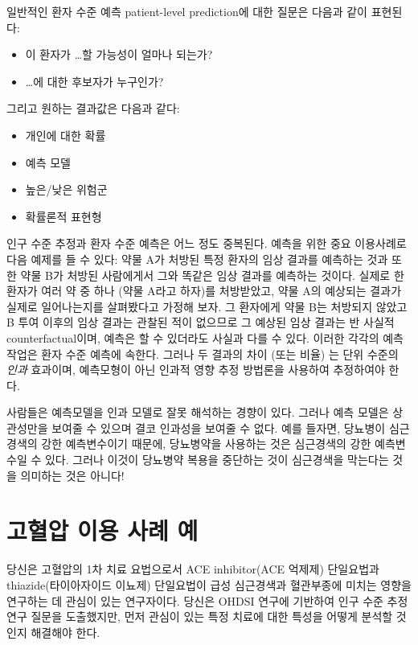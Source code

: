 \documentclass[10.5pt]{book}
\providecommand{\tightlist}{%
  \setlength{\itemsep}{0pt}\setlength{\parskip}{0pt}}
\theoremstyle{definition}
\theoremstyle{definition}
\theoremstyle{definition}
\theoremstyle{remark}
\let\BeginKnitrBlock\begin \let\EndKnitrBlock\end
\begin{document}
일반적인 환자 수준 예측 patient-level prediction에 대한 질문은 다음과
같이 표현된다:

\begin{itemize}
\tightlist
\item
  이 환자가 \ldots{}할 가능성이 얼마나 되는가?
\item
  \ldots{}에 대한 후보자가 누구인가?
\end{itemize}

그리고 원하는 결과값은 다음과 같다:

\begin{itemize}
\tightlist
\item
  개인에 대한 확률
\item
  예측 모델
\item
  높은/낮은 위험군
\item
  확률론적 표현형
\end{itemize}

인구 수준 추정과 환자 수준 예측은 어느 정도 중복된다. 예측을 위한 중요
이용사례로 다음 예제를 들 수 있다: 약물 A가 처방된 특정 환자의 임상
결과를 예측하는 것과 또한 약물 B가 처방된 사람에게서 그와 똑같은 임상
결과를 예측하는 것이다. 실제로 한 환자가 여러 약 중 하나 (약물 A라고
하자)를 처방받았고, 약물 A의 예상되는 결과가 실제로 일어나는지를
살펴봤다고 가정해 보자. 그 환자에게 약물 B는 처방되지 않았고 B 투여
이후의 임상 결과는 관찰된 적이 없으므로 그 예상된 임상 결과는 반 사실적
counterfactual이며, 예측은 할 수 있더라도 사실과 다를 수 있다. 이러한
각각의 예측 작업은 환자 수준 예측에 속한다. 그러나 두 결과의 차이 (또는
비율) 는 단위 수준의 \emph{인과} 효과이며, 예측모형이 아닌 인과적 영향
추정 방법론을 사용하여 추정하여야 한다.

\BeginKnitrBlock{rmdimportant}
사람들은 예측모델을 인과 모델로 잘못 해석하는 경향이 있다. 그러나 예측
모델은 상관성만을 보여줄 수 있으며 결코 인과성을 보여줄 수 없다. 예를
들자면, 당뇨병이 심근경색의 강한 예측변수이기 때문에, 당뇨병약을
사용하는 것은 심근경색의 강한 예측변수일 수 있다. 그러나 이것이 당뇨병약
복용을 중단하는 것이 심근경색을 막는다는 것을 의미하는 것은 아니다!
\EndKnitrBlock{rmdimportant}

\section{고혈압 이용 사례 예}\label{---}

당신은 고혈압의 1차 치료 요법으로서 ACE inhibitor(ACE 억제제) 단일요법과
thiazide(타이아자이드 이뇨제) 단일요법이 급성 심근경색과 혈관부종에
미치는 영향을 연구하는 데 관심이 있는 연구자이다. 당신은 OHDSI 연구에
기반하여 인구 수준 추정 연구 질문을 도출했지만, 먼저 관심이 있는 특정
치료에 대한 특성을 어떻게 분석할 것인지 해결해야 한다.
\end{document}
